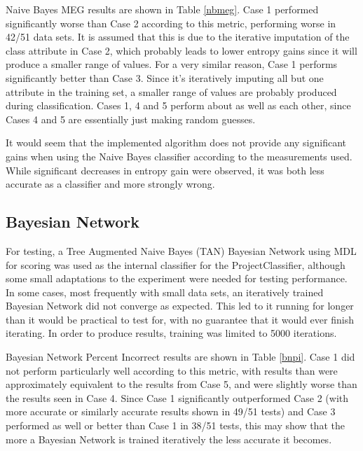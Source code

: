 Naive Bayes MEG results are shown in Table \ref{nbmeg}. Case 1 performed significantly worse than Case 2 according to this metric, performing worse in 42/51 data sets. It is assumed that this is due to the iterative imputation of the class attribute in Case 2, which probably leads to lower entropy gains since it will produce a smaller range of values. For a very similar reason, Case 1 performs significantly better than Case 3. Since it's iteratively imputing all but one attribute in the training set, a smaller range of values are probably produced during classification. Cases 1, 4 and 5 perform about as well as each other, since Cases 4 and 5 are essentially just making random guesses.

It would seem that the implemented algorithm does not provide any significant gains when using the Naive Bayes classifier according to the measurements used. While significant decreases in entropy gain were observed, it was both less accurate as a classifier and more strongly wrong.





\FloatBarrier

\subsection{Bayesian Network}
For testing, a Tree Augmented Naive Bayes (TAN) Bayesian Network using MDL for scoring was used as the internal classifier for the ProjectClassifier, although some small adaptations to the experiment were needed for testing performance. In some cases, most frequently with small data sets, an iteratively trained Bayesian Network did not converge as expected. This led to it running for longer than it would be practical to test for, with no guarantee that it would ever finish iterating. In order to produce results, training was limited to 5000 iterations.

Bayesian Network Percent Incorrect results are shown in Table \ref{bnpi}. Case 1 did not perform particularly well according to this metric, with results than were approximately equivalent to the results from Case 5, and were slightly worse than the results seen in Case 4. Since Case 1 significantly outperformed Case 2 (with more accurate or similarly accurate results shown in 49/51 tests) and Case 3 performed as well or better than Case 1 in 38/51 tests, this may show that the more a Bayesian Network is trained iteratively the less accurate it becomes. 


